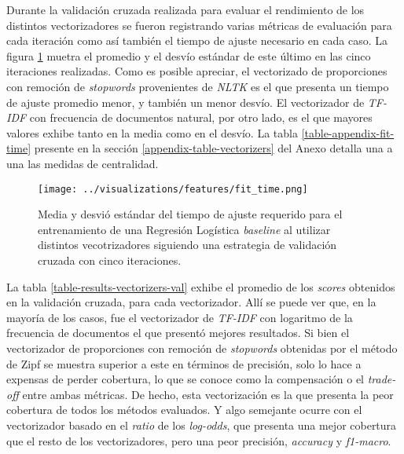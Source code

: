 Durante la validación cruzada realizada para evaluar el rendimiento de los
distintos vectorizadores se fueron registrando varias métricas de evaluación
para cada iteración como así también el tiempo de ajuste necesario en cada caso.
La figura \ref{fig-results-features-fit-time} muetra el promedio y el desvío
estándar de este último en las cinco iteraciones realizadas. Como es posible
apreciar, el vectorizado de proporciones con remoción de \textit{stopwords}
provenientes de \textit{NLTK} es el que presenta un tiempo de ajuste promedio
menor, y también un menor desvío. El vectorizador de \textit{TF-IDF} con
frecuencia de documentos natural, por otro lado, es el que mayores valores
exhibe tanto en la media como en el desvío. La tabla \ref{table-appendix-fit-time}
presente en la sección \ref{appendix-table-vectorizers} del Anexo detalla una
a una las medidas de centralidad.

\begin{figure}[h!]
    \centering
    \texttt{[image: ../visualizations/features/fit\_time.png]}
    \caption{Media y desvió estándar del tiempo de ajuste requerido
    para el entrenamiento de una Regresión Logística \textit{baseline}
    al utilizar distintos vecotrizadores siguiendo una estrategia de
    validación cruzada con cinco iteraciones.}
    \label{fig-results-features-fit-time}
\end{figure}

La tabla \ref{table-results-vectorizers-val} exhibe el promedio de los \textit{scores}
obtenidos en la validación cruzada, para cada vectorizador. Allí se puede ver que,
en la mayoría de los casos, fue el vectorizador de \textit{TF-IDF} con logaritmo
de la frecuencia de documentos el que presentó mejores resultados. Si bien el
vectorizador de proporciones con remoción de \textit{stopwords} obtenidas por el
método de Zipf se muestra superior a este en términos de precisión, solo
lo hace a expensas de perder cobertura, lo que se conoce como la compensación o el
\textit{trade-off} entre ambas métricas. De hecho, esta vectorización es la que
presenta la peor cobertura de todos los métodos evaluados. Y algo semejante ocurre
con el vectorizador basado en el \textit{ratio} de los \textit{log-odds}, que
presenta una mejor cobertura que el resto de los vectorizadores, pero una peor
precisión, \textit{accuracy} y \textit{f1-macro}.

